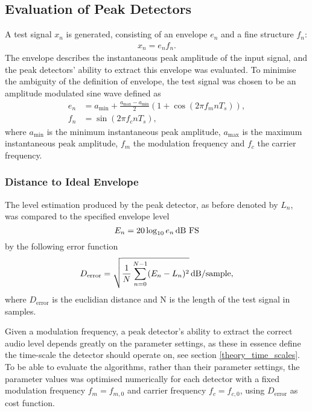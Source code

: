 \documentclass[../main2.tex]{subfiles}
\begin{document}
\subsection{Evaluation of Peak Detectors}\label{method_peak_detectors}
A test signal $x_n$ is generated, consisting of an envelope $e_n$ and a fine structure $f_n$:
\begin{align}
x_n = e_n f_n.
\end{align}
The envelope describes the instantaneous peak amplitude of the input signal, and the peak detectors' ability to extract this envelope was evaluated. To minimise the ambiguity of the definition of envelope, the test signal was chosen to be an amplitude modulated sine wave defined as
\begin{equation}
\begin{split}
	e_n &= a_\text{min} + \frac{a_\text{max}- a_\text{min}}{2} \left(1 + \cos(2 \pi f_m n T_s) \right), \\
	f_n &= \sin(2 \pi f_c n T_s),
\end{split}
\end{equation}
where $a_\text{min}$ is the minimum instantaneous peak amplitude, $a_\text{max}$ is the maximum instantaneous peak amplitude, $f_m$ the modulation frequency and $f_c$ the carrier frequency.

\subsubsection{Distance to Ideal Envelope}
The level estimation produced by the peak detector, as before denoted by $L_n$, was compared to the specified envelope level
\begin{equation}
E_n = 20 \log_{10} e_n \mskip3mu\text{dB FS}
\end{equation}
by the following error function
\begin{equation}
D_\text{error} = \sqrt{ \frac{1}{N}\sum_{n = 0}^{N-1} (E_n - L_n)^2 } \mskip3mu\text{dB} / \text{sample},
\end{equation}
where $D_\text{error}$ is the euclidian distance and N is the length of the test signal in samples. 

Given a modulation frequency, a peak detector's ability to extract the correct audio level depends greatly on the parameter settings, as these in essence define the time-scale the detector should operate on, see section \ref{theory_time_scales}. To be able to evaluate the algorithms, rather than their parameter settings, the parameter values was optimised numerically for each detector with a fixed modulation frequency $f_m = f_{m,0}$ and carrier frequency $f_c = f_{c,0}$, using $D_\text{error}$ as cost function.
\end{document}

